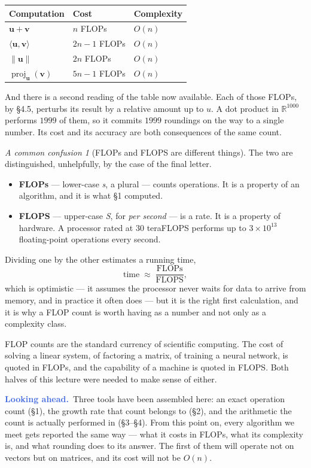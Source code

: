 \documentclass[11pt]{article}
\theoremstyle{plain}
\theoremstyle{definition}
\theoremstyle{remark}
\newtheorem*{warn}{A common confusion}
\newcommand{\lookahead}{\par\smallskip\noindent
  \textbf{\sffamily\textcolor{RoyalBlue}{Looking ahead.}}\ \ignorespaces}
\newcommand{\R}{\mathbb{R}}
\newcommand{\vc}[1]{\mathbf{#1}}
\newcommand{\norm}[1]{\lVert #1\rVert}
\newcommand{\proj}[2]{\operatorname{proj}_{#1}(#2)}
\begin{document}
\begin{center}
\renewcommand{\arraystretch}{1.3}
\begin{tabular}{@{}l l l@{}}
\toprule
\textbf{Computation} & \textbf{Cost} & \textbf{Complexity} \\
\midrule
$\vc{u}+\vc{v}$                    & $n$ FLOPs    & $O(n)$ \\
$\langle\vc{u},\vc{v}\rangle$      & $2n-1$ FLOPs & $O(n)$ \\
$\norm{\vc{u}}$                    & $2n$ FLOPs   & $O(n)$ \\
$\proj{\vc{u}}{\vc{v}}$            & $5n-1$ FLOPs & $O(n)$ \\
\bottomrule
\end{tabular}
\end{center}

\noindent And there is a second reading of the table now available. Each of
those FLOPs, by \S4.5, perturbs its result by a relative amount up to $u$. A dot
product in $\R^{1000}$ performs $1999$ of them, so it commits $1999$ roundings
on the way to a single number. Its cost and its accuracy are both consequences
of the same count.

\begin{warn}[FLOPs and FLOPS are different things]
The two are distinguished, unhelpfully, by the case of the final letter.
\begin{itemize}[leftmargin=1.4em,itemsep=3pt,topsep=3pt]
  \item \textbf{FLOPs} --- lower-case \emph{s}, a plural --- counts operations.
        It is a property of an algorithm, and it is what \S1 computed.
  \item \textbf{FLOPS} --- upper-case \emph{S}, for \emph{per second} --- is a
        rate. It is a property of hardware. A processor rated at $30$
        teraFLOPS performs up to $3\times10^{13}$ floating-point operations
        every second.
\end{itemize}
Dividing one by the other estimates a running time,
\[
  \text{time} \;\approx\; \frac{\text{FLOPs}}{\text{FLOPS}} ,
\]
which is optimistic --- it assumes the processor never waits for data to arrive
from memory, and in practice it often does --- but it is the right first
calculation, and it is why a FLOP count is worth having as a number and not only
as a complexity class.
\end{warn}

\noindent FLOP counts are the standard currency of scientific computing. The
cost of solving a linear system, of factoring a matrix, of training a neural
network, is quoted in FLOPs, and the capability of a machine is quoted in FLOPS.
Both halves of this lecture were needed to make sense of either.

\lookahead Three tools have been assembled here: an exact operation count
(\S1), the growth rate that count belongs to (\S2), and the arithmetic the count
is actually performed in (\S3--\S4). From this point on, every algorithm we meet
gets reported the same way --- what it costs in FLOPs, what its complexity is,
and what rounding does to its answer. The first of them will operate not on
vectors but on matrices, and its cost will not be $O(n)$.
\end{document}
